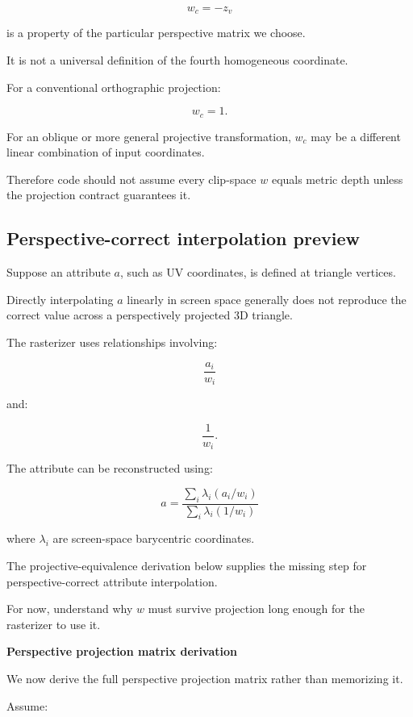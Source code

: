 \[
 w_c=-z_v
\]

is a property of the particular perspective matrix we choose.

It is not a universal definition of the fourth homogeneous coordinate.

For a conventional orthographic projection:

\[
 w_c=1.
\]

For an oblique or more general projective transformation, \(w_c\) may be a different linear combination of input coordinates.

Therefore code should not assume every clip-space \(w\) equals metric depth unless the projection contract guarantees it.

\subsection{Perspective-correct interpolation preview}\label{02-foundations-ii-ch033-perspective-correct-interpolation-preview}

\hypertarget{02-foundations-ii-ch033-perspective-correct-interpolation-preview}{}

Suppose an attribute \(a\), such as UV coordinates, is defined at triangle vertices.

Directly interpolating \(a\) linearly in screen space generally does not reproduce the correct value across a perspectively projected 3D triangle.

The rasterizer uses relationships involving:

\[
 \frac{a_i}{w_i}
\]

and:

\[
 \frac1{w_i}.
\]

The attribute can be reconstructed using:

\[
 \boxed{ a= \frac{ \sum_i\lambda_i(a_i/w_i) }{ \sum_i\lambda_i(1/w_i) } }
\]

where \(\lambda_i\) are screen-space barycentric coordinates.

The projective-equivalence derivation below supplies the missing step for perspective-correct attribute interpolation.

For now, understand why \(w\) must survive projection long enough for the rasterizer to use it.

\textbf{Perspective projection matrix derivation}

We now derive the full perspective projection matrix rather than memorizing it.

Assume:

